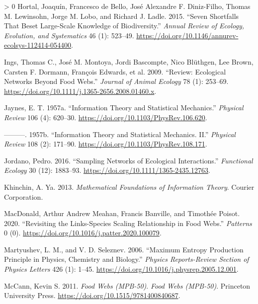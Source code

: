 \documentclass[11pt]{article}
\newlength{\cslhangindent}
\newenvironment{CSLReferences}[3] %
 {%
  \setlength{\parindent}{0pt}
  \ifodd #1 \everypar{\setlength{\hangindent}{\cslhangindent}}\ignorespaces\fi
  \ifnum #2 > 0
  \setlength{\parskip}{#2\baselineskip}
  \fi
 }%
 {}
\begin{document}
\begin{CSLReferences}{1}{0}
\leavevmode\hypertarget{ref-Hortal2015SevSho}{}%
Hortal, Joaquín, Francesco de Bello, José Alexandre F. Diniz-Filho,
Thomas M. Lewinsohn, Jorge M. Lobo, and Richard J. Ladle. 2015. {``Seven
Shortfalls That Beset Large-Scale Knowledge of Biodiversity.''}
\emph{Annual Review of Ecology, Evolution, and Systematics} 46 (1):
523--49. \url{https://doi.org/10.1146/annurev-ecolsys-112414-054400}.

\leavevmode\hypertarget{ref-Ings2009RevEco}{}%
Ings, Thomas C., José M. Montoya, Jordi Bascompte, Nico Blüthgen, Lee
Brown, Carsten F. Dormann, François Edwards, et al. 2009. {``Review:
Ecological Networks Beyond Food Webs.''} \emph{Journal of Animal
Ecology} 78 (1): 253--69.
\url{https://doi.org/10.1111/j.1365-2656.2008.01460.x}.

\leavevmode\hypertarget{ref-Jaynes1957InfThe}{}%
Jaynes, E. T. 1957a. {``Information Theory and Statistical Mechanics.''}
\emph{Physical Review} 106 (4): 620--30.
\url{https://doi.org/10.1103/PhysRev.106.620}.

\leavevmode\hypertarget{ref-Jaynes1957InfThea}{}%
---------. 1957b. {``Information Theory and Statistical Mechanics.
II.''} \emph{Physical Review} 108 (2): 171--90.
\url{https://doi.org/10.1103/PhysRev.108.171}.

\leavevmode\hypertarget{ref-Jordano2016SamNeta}{}%
Jordano, Pedro. 2016. {``Sampling Networks of Ecological
Interactions.''} \emph{Functional Ecology} 30 (12): 1883--93.
\url{https://doi.org/10.1111/1365-2435.12763}.

\leavevmode\hypertarget{ref-Khinchin2013MatFou}{}%
Khinchin, A. Ya. 2013. \emph{Mathematical Foundations of Information
Theory}. Courier Corporation.

\leavevmode\hypertarget{ref-MacDonald2020RevLin}{}%
MacDonald, Arthur Andrew Meahan, Francis Banville, and Timothée Poisot.
2020. {``Revisiting the Links-Species Scaling Relationship in Food
Webs.''} \emph{Patterns} 0 (0).
\url{https://doi.org/10.1016/j.patter.2020.100079}.

\leavevmode\hypertarget{ref-Martyushev2006MaxEnt}{}%
Martyushev, L. M., and V. D. Seleznev. 2006. {``Maximum Entropy
Production Principle in Physics, Chemistry and Biology.''} \emph{Physics
Reports-Review Section of Physics Letters} 426 (1): 1--45.
\url{https://doi.org/10.1016/j.physrep.2005.12.001}.

\leavevmode\hypertarget{ref-McCann2011FooWeb}{}%
McCann, Kevin S. 2011. \emph{Food Webs (MPB-50)}. \emph{Food Webs
(MPB-50)}. Princeton University Press.
\url{https://doi.org/10.1515/9781400840687}.


\end{CSLReferences}
\end{document}
